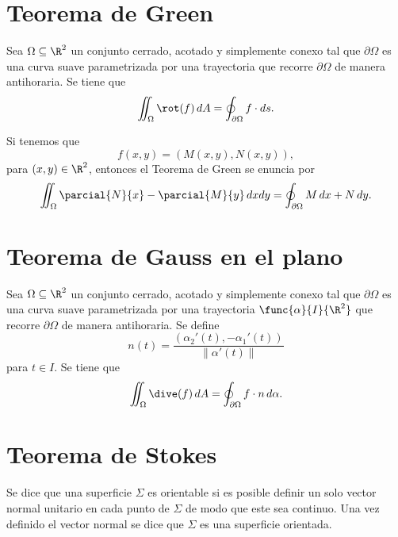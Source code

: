 \documentclass[a4,11pt]{aleph-notas}
\begin{document}
\encabezado

\section{Teorema de Green}

\begin{teo}
    Sea $\Omega\subseteq \R^2$ un conjunto cerrado, acotado y simplemente conexo tal que $\partial \Omega$ es una curva suave parametrizada por una trayectoria que recorre $\partial \Omega$ de manera antihoraria. Se tiene que
    \[
        \iint_\Omega \rot(f) \,dA = \oint_{\partial \Omega} f\cdot ds.
    \]
\end{teo}

\begin{advertencia}
    Si tenemos que
    \[
        f(x,y)=(M(x,y),N(x,y)),
    \]
    para $(x,y)\in\R^2$, entonces el Teorema de Green se enuncia por
    \[
        \iint_\Omega \parcial{N}{x} - \parcial{M}{y} \,dxdy = \oint_{\partial \Omega} M\, dx+ N\, dy.
    \]
\end{advertencia}

\section{Teorema de Gauss en el plano}

\begin{teo}
    Sea $\Omega\subseteq \R^2$ un conjunto cerrado, acotado y simplemente conexo tal que $\partial \Omega$ es una curva suave parametrizada por una trayectoria $\func{\alpha}{I}{\R^2}$ que recorre $\partial \Omega$ de manera antihoraria. Se define
    \[
        n(t) = \frac{(\alpha_2'(t),- \alpha_1'(t))}{\|\alpha'(t)\|}
    \]
    para $t\in I$. Se tiene que
    \[
        \iint_\Omega \dive(f) \,dA = \oint_{\partial \Omega} f\cdot n\, d\alpha.
    \]
\end{teo}

\section{Teorema de Stokes}

\begin{defi}
    Se dice que una superficie $\Sigma$ es orientable si es posible definir un solo vector normal unitario en cada punto de $\Sigma$ de modo que este sea continuo. Una vez definido el vector normal se dice que $\Sigma$ es una superficie orientada.
\end{defi}
\end{document}
